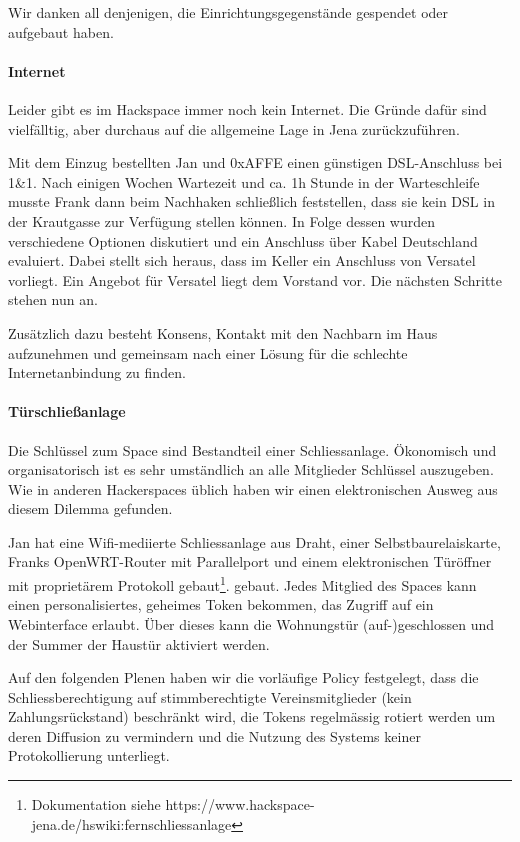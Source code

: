 \documentclass[10pt,DIV16]{scrartcl}
\begin{document}
Wir danken all denjenigen, die Einrichtungsgegenstände gespendet oder
aufgebaut haben.  

\paragraph{Internet}

Leider gibt es im Hackspace immer noch kein Internet. Die Gründe 
dafür sind vielfälltig, aber durchaus auf die allgemeine Lage in 
Jena zurückzuführen. 

Mit dem Einzug bestellten Jan und 0xAFFE einen günstigen 
DSL-Anschluss bei 1\&1. Nach einigen Wochen Wartezeit und ca. 1h 
Stunde in der Warteschleife musste Frank dann beim Nachhaken 
schließlich feststellen, dass sie kein DSL in der Krautgasse zur 
Verfügung stellen können. In Folge dessen wurden verschiedene 
Optionen diskutiert und ein Anschluss über Kabel Deutschland 
evaluiert. Dabei stellt sich heraus, dass im Keller ein Anschluss 
von Versatel vorliegt. Ein Angebot für Versatel liegt dem Vorstand 
vor. Die nächsten Schritte stehen nun an.

Zusätzlich dazu besteht Konsens, Kontakt mit den Nachbarn im Haus 
aufzunehmen und gemeinsam nach einer Lösung für die schlechte 
Internetanbindung zu finden.

\paragraph{Türschließanlage}

Die Schl\"ussel zum Space sind Bestandteil einer
Schliessanlage. \"Okonomisch und organisatorisch ist es sehr
umst\"andlich an alle Mitglieder Schl\"ussel auszugeben. Wie in
anderen Hackerspaces \"ublich haben wir einen elektronischen Ausweg
aus diesem Dilemma gefunden.

Jan hat eine Wifi-mediierte Schliessanlage aus Draht, einer
Selbstbaurelaiskarte, Franks OpenWRT-Router mit Parallelport und einem
elektronischen T\"ur\"offner mit propriet\"arem Protokoll
gebaut\footnote{Dokumentation siehe
  https://www.hackspace-jena.de/hswiki:fernschliessanlage}.
gebaut. Jedes Mitglied des Spaces kann einen personalisiertes,
geheimes Token bekommen, das Zugriff auf ein Webinterface
erlaubt. \"Uber dieses kann die Wohnungst\"ur (auf-)geschlossen und der
Summer der Haust\"ur aktiviert werden.

Auf den folgenden Plenen haben wir die vorl\"aufige Policy festgelegt,
dass die Schliessberechtigung auf stimmberechtigte Vereinsmitglieder
(kein Zahlungsr\"uckstand) beschr\"ankt wird, die Tokens regelm\"assig
rotiert werden um deren Diffusion zu vermindern und die Nutzung des
Systems keiner Protokollierung unterliegt.
\end{document}
